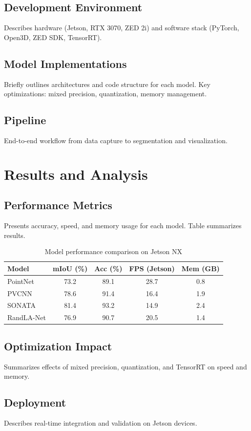 \documentclass[12pt,a4paper]{report}
\begin{document}
\section{Development Environment}
Describes hardware (Jetson, RTX 3070, ZED 2i) and software stack (PyTorch, Open3D, ZED SDK, TensorRT).
\section{Model Implementations}
Briefly outlines architectures and code structure for each model. Key optimizations: mixed precision, quantization, memory management.
\section{Pipeline}
End-to-end workflow from data capture to segmentation and visualization.
\chapter{Results and Analysis}
\section{Performance Metrics}
Presents accuracy, speed, and memory usage for each model. Table summarizes results.
\begin{table}[htbp]
\centering
\begin{tabular}{lcccc}
\toprule
Model & mIoU (\%) & Acc (\%) & FPS (Jetson) & Mem (GB) \\
\midrule
PointNet & 73.2 & 89.1 & 28.7 & 0.8 \\
PVCNN & 78.6 & 91.4 & 16.4 & 1.9 \\
SONATA & 81.4 & 93.2 & 14.9 & 2.4 \\
RandLA-Net & 76.9 & 90.7 & 20.5 & 1.4 \\
\bottomrule
\end{tabular}
\caption{Model performance comparison on Jetson NX}
\end{table}
\section{Optimization Impact}
Summarizes effects of mixed precision, quantization, and TensorRT on speed and memory.
\section{Deployment}
Describes real-time integration and validation on Jetson devices.
\end{document}
